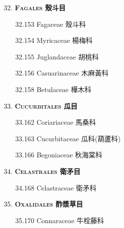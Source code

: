 \begin{enumerate}
\begin{enumerate}
    \end{enumerate}
  \item[32. ] \textbf{\textsc{Fagales} 殼斗目}   
    \begin{enumerate}
      \item[32.153] Fagaceae 殼斗科     
        
      \item[32.154] Myricaceae 楊梅科     
        
      \item[32.155] Juglandaceae 胡桃科     
        
      \item[32.156] Casuarinaceae 木麻黃科     
        
      \item[32.158] Betulaceae 樺木科     
        
    \end{enumerate}
  \item[33. ] \textbf{\textsc{Cucurbitales} 瓜目}   
    \begin{enumerate}
      \item[33.162] Coriariaceae 馬桑科     
        
      \item[33.163] Cucurbitaceae 瓜科(葫蘆科)     
        
      \item[33.166] Begoniaceae 秋海棠科     
        
    \end{enumerate}
  \item[34. ] \textbf{\textsc{Celastrales} 衛矛目}   
    \begin{enumerate}
      \item[34.168] Celastraceae 衛矛科     
        
    \end{enumerate}
  \item[35. ] \textbf{\textsc{Oxalidales} 酢漿草目}   
    \begin{enumerate}
      \item[35.170] Connaraceae 牛栓藤科     
        

\end{enumerate}
\end{enumerate}
